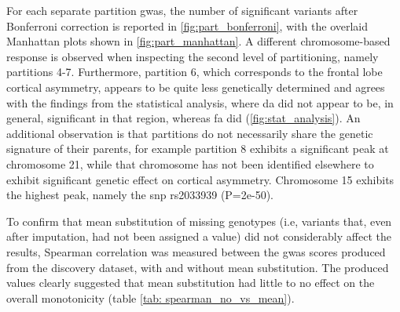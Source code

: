 For each separate partition \ac{gwas}, the number of significant variants after Bonferroni correction is reported in \autoref{fig:part_bonferroni}, with the overlaid Manhattan plots shown  in \autoref{fig:part_manhattan}. A different chromosome-based response is observed when inspecting the second level of partitioning, namely partitions 4-7. Furthermore, partition 6, which corresponds to the frontal lobe cortical asymmetry, appears to be quite less genetically determined and agrees with the findings from the statistical analysis, where \ac{da} did not appear to be, in general, significant in that region, whereas \ac{fa} did (\autoref{fig:stat_analysis}). An additional observation is that partitions do not necessarily share the genetic signature of their parents, for example partition 8 exhibits a significant peak at chromosome 21, while that chromosome has not been identified elsewhere to exhibit significant genetic effect on cortical asymmetry.  Chromosome 15 exhibits the highest peak, namely the \ac{snp} rs2033939 (P=2e-50).

To confirm that mean substitution of missing genotypes (i.e, variants that, even after imputation, had not been assigned a value) did not considerably affect the results, Spearman correlation was measured between the \ac{gwas} scores produced from the discovery dataset, with and without mean substitution. The produced values clearly suggested that mean substitution had little to no effect on the overall monotonicity (table \autoref{tab: spearman_no_vs_mean}).


